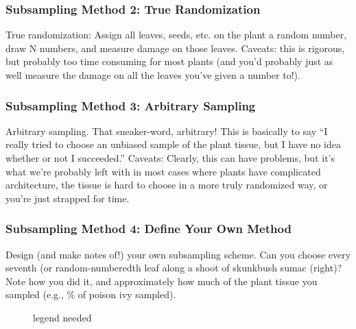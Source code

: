 \documentclass[
  letterpaper,
  oneside,
  open=any]{scrbook}
\begin{document}
\subsubsection{Subsampling Method 2: True
Randomization}\label{subsampling-method-2-true-randomization}

True randomization: Assign all leaves, seeds, etc. on the plant a random
number, draw N numbers, and measure damage on those leaves. Caveats:
this is rigorous, but probably too time consuming for most plants (and
you'd probably just as well measure the damage on all the leaves you've
given a number to!).

\subsubsection{Subsampling Method 3: Arbitrary
Sampling}\label{subsampling-method-3-arbitrary-sampling}

Arbitrary sampling. That sneaker-word, arbitrary! This is basically to
say ``I really tried to choose an unbiased sample of the plant tissue,
but I have no idea whether or not I succeeded.'' Caveats: Clearly, this
can have problems, but it's what we're probably left with in most cases
where plants have complicated architecture, the tissue is hard to choose
in a more truly randomized way, or you're just strapped for time.

\subsubsection{Subsampling Method 4: Define Your Own
Method}\label{subsampling-method-4-define-your-own-method}

Design (and make notes of!) your own subsampling scheme. Can you choose
every seventh (or random-numberedth leaf along a shoot of skunkbush
sumac (right)? Note how you did it, and approximately how much of the
plant tissue you sampled (e.g., \% of poison ivy sampled).

\begin{figure}


\caption{\label{fig-random}legend needed}

\end{figure}%
\end{document}
